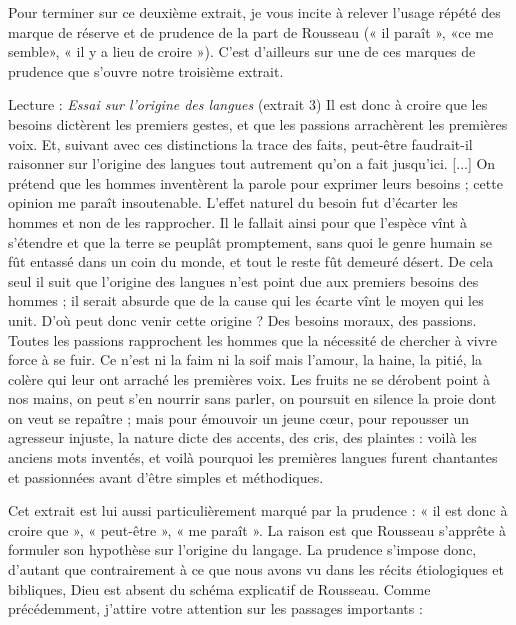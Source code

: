 Pour terminer sur ce deuxième extrait, je vous incite à relever l’usage répété des marque de réserve et de prudence de la part de Rousseau (« il paraît », «ce me semble», « il y a lieu de croire »). C’est d’ailleurs sur une de ces marques de prudence que s’ouvre notre troisième extrait.
\begin{lecture}{Lecture : \textit{Essai sur l’origine des langues} (extrait 3)}
Il est donc à croire que les besoins dictèrent les premiers gestes, et que les passions arrachèrent les premières voix. Et, suivant avec ces distinctions la trace des faits, peut-être faudrait-il raisonner sur l’origine des langues tout autrement qu’on a fait jusqu’ici. [...] On prétend que les hommes inventèrent la parole pour exprimer leurs besoins ; cette opinion me paraît insoutenable. L’effet naturel du besoin fut d’écarter les hommes et non de les rapprocher. Il le fallait ainsi pour que l’espèce vînt à s’étendre et que la terre se peuplât promptement, sans quoi le genre humain se fût entassé dans un coin du monde, et tout le reste fût demeuré désert. De cela seul il suit que l’origine des langues n’est point due aux premiers besoins des hommes ; il serait absurde que de la cause qui les écarte vînt le moyen qui les unit. D’où peut donc venir cette origine ? Des besoins moraux, des passions. Toutes les passions rapprochent les hommes que la nécessité de chercher à vivre force à se fuir. Ce n’est ni la faim ni la soif mais l’amour, la haine, la pitié, la colère qui leur ont arraché les premières voix. Les fruits ne se dérobent point à nos mains, on peut s’en nourrir sans parler, on poursuit en silence la proie dont on veut se repaître ; mais pour émouvoir un jeune cœur, pour repousser un agresseur injuste, la nature dicte des accents, des cris, des plaintes : voilà les anciens mots inventés, et voilà pourquoi les premières langues furent chantantes et passionnées avant d’être simples et méthodiques.
\end{lecture}
Cet extrait est lui aussi particulièrement marqué par la prudence : « il est donc à croire que », « peut-être », « me paraît ». La raison est que Rousseau s’apprête à formuler son hypothèse sur l’origine du langage. La prudence s’impose donc, d’autant que contrairement à ce que nous avons vu dans les récits étiologiques et bibliques, Dieu est absent du schéma explicatif de Rousseau. Comme précédemment, j’attire votre attention sur les passages importants :
